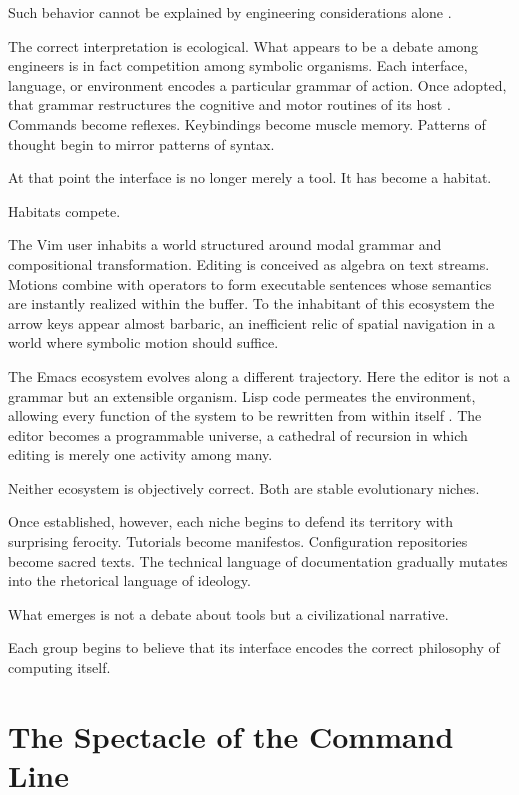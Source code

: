 \documentclass[12pt]{article}
\theoremstyle{definition}
\begin{document}
Such behavior cannot be explained by engineering considerations alone
\cite{brooks1975}.

The correct interpretation is ecological. What appears to be a debate
among engineers is in fact competition among symbolic organisms. Each
interface, language, or environment encodes a particular grammar of
action. Once adopted, that grammar restructures the cognitive and motor
routines of its host \cite{norman1988}. Commands become reflexes.
Keybindings become muscle memory. Patterns of thought begin to mirror
patterns of syntax.

At that point the interface is no longer merely a tool. It has become a
habitat.

Habitats compete.

The Vim user inhabits a world structured around modal grammar and
compositional transformation. Editing is conceived as algebra on text
streams. Motions combine with operators to form executable sentences
whose semantics are instantly realized within the buffer. To the
inhabitant of this ecosystem the arrow keys appear almost barbaric, an
inefficient relic of spatial navigation in a world where symbolic motion
should suffice.

The Emacs ecosystem evolves along a different trajectory. Here the editor
is not a grammar but an extensible organism. Lisp code permeates the
environment, allowing every function of the system to be rewritten from
within itself \cite{stallman2002}. The editor becomes a programmable
universe, a cathedral of recursion in which editing is merely one
activity among many.

Neither ecosystem is objectively correct. Both are stable evolutionary
niches.

Once established, however, each niche begins to defend its territory
with surprising ferocity. Tutorials become manifestos. Configuration
repositories become sacred texts. The technical language of documentation
gradually mutates into the rhetorical language of ideology.

What emerges is not a debate about tools but a civilizational narrative.

Each group begins to believe that its interface encodes the correct
philosophy of computing itself.

\section{The Spectacle of the Command Line}
\end{document}
